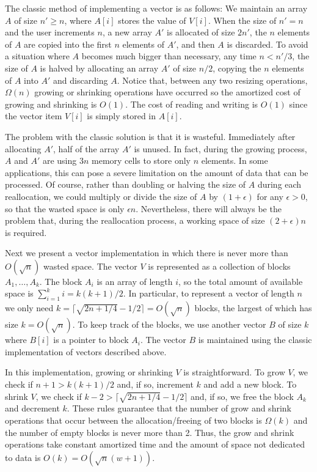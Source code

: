 The classic method of implementing a vector is as follows:  We maintain an
array $A$ of size $n'\ge n$, where $A[i]$ stores the value of $V[i]$.  When
the size of $n'=n$ and the user increments $n$, a new array $A'$ is
allocated of size $2n'$, the $n$ elements of $A$ are copied into the first
$n$ elements of $A'$, and then $A$ is discarded.  To avoid a situation
where $A$ becomes much bigger than necessary, any time $n < n'/3$, the size
of $A$ is halved by allocating an array $A'$ of size $n/2$, copying the $n$
elements of $A$ into $A'$ and discarding $A$.  Notice that, between any two
resizing operations, $\Omega(n)$ growing or shrinking operations have
occurred so the amortized cost of growing and shrinking is $O(1)$.  The
cost of reading and writing is $O(1)$ since the vector item $V[i]$ is
simply stored in $A[i]$.

The problem with the classic solution is that it is wasteful.  Immediately
after allocating $A'$, half of the array $A'$ is unused.  In fact, during
the growing process, $A$ and $A'$ are using $3n$ memory cells to store
only $n$ elements.  In some applications, this can pose a severe limitation
on the amount of data that can be processed.  Of course, rather than
doubling or halving the size of $A$ during each reallocation, we could
multiply or divide the size of $A$ by $(1+\epsilon)$ for any $\epsilon >0$,
so that the wasted space is only $\epsilon n$.  Nevertheless, there will
always be the problem that, during the reallocation process, a working
space of size $(2+\epsilon)n$ is required.

Next we present a vector implementation in which there is never more than
$O(\sqrt{n})$ wasted space. The vector $V$ is represented as a collection
of blocks $A_1,\ldots,A_k$. The block $A_i$ is an array of length $i$,
so the total amount of available space is $\sum_{i=1}^k i = k(k+1)/2$.
In particular, to represent a vector of length $n$ we only need $k= 
\lceil\sqrt{2n+1/4}-1/2\rceil = O(\sqrt{n})$ blocks, the largest of
which has size $k = O(\sqrt{n})$.  To keep track of the blocks, we use
another vector $B$ of size $k$ where $B[i]$ is a pointer to block $A_i$.
The vector $B$ is maintained using the classic implementation of vectors
described above.

In this implementation, growing or shrinking $V$ is straightforward.
To grow $V$, we check if $n+1> k(k+1)/2$ and, if so, increment
$k$ and add a new block.  To shrink $V$, we check if $k - 2 >
\lceil\sqrt{2n+1/4}-1/2\rceil$ and, if so, we free the block $A_k$ and
decrement $k$. These rules guarantee that the number of grow and shrink
operations that occur between the allocation/freeing of two blocks
is $\Omega(k)$ and the number of empty blocks is never more than 2.
Thus, the grow and shrink operations take constant amortized time and
the amount of space not dedicated to data is $O(k)=O(\sqrt{n}(w+1))$.

